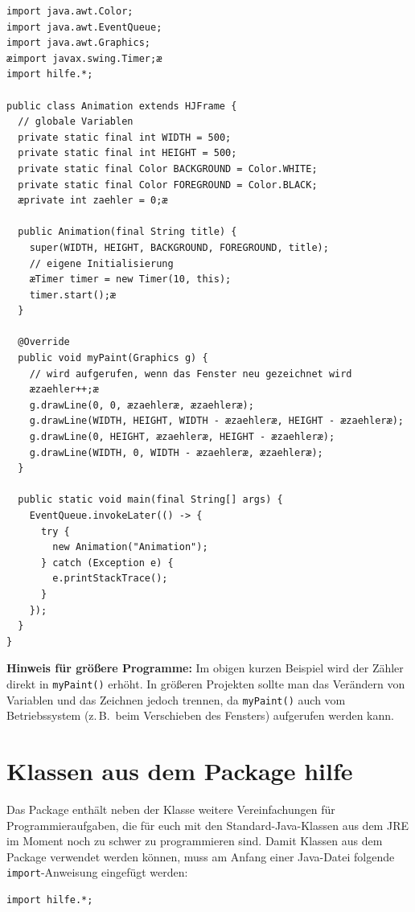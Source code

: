 \begin{lstlisting}
import java.awt.Color;
import java.awt.EventQueue;
import java.awt.Graphics;
æimport javax.swing.Timer;æ
import hilfe.*;

public class Animation extends HJFrame {
  // globale Variablen
  private static final int WIDTH = 500;
  private static final int HEIGHT = 500;
  private static final Color BACKGROUND = Color.WHITE;
  private static final Color FOREGROUND = Color.BLACK;
  æprivate int zaehler = 0;æ

  public Animation(final String title) {
    super(WIDTH, HEIGHT, BACKGROUND, FOREGROUND, title);
    // eigene Initialisierung
    æTimer timer = new Timer(10, this);
    timer.start();æ
  }
  
  @Override
  public void myPaint(Graphics g) {
    // wird aufgerufen, wenn das Fenster neu gezeichnet wird
    æzaehler++;æ
    g.drawLine(0, 0, æzaehleræ, æzaehleræ);
    g.drawLine(WIDTH, HEIGHT, WIDTH - æzaehleræ, HEIGHT - æzaehleræ);
    g.drawLine(0, HEIGHT, æzaehleræ, HEIGHT - æzaehleræ);
    g.drawLine(WIDTH, 0, WIDTH - æzaehleræ, æzaehleræ);
  }
  
  public static void main(final String[] args) {
    EventQueue.invokeLater(() -> {
      try {
        new Animation("Animation");
      } catch (Exception e) {
        e.printStackTrace();
      }
    });
  }
}
\end{lstlisting}

\noindent \textbf{Hinweis für größere Programme:} Im obigen kurzen Beispiel wird
der Zähler direkt in \lstinline|myPaint()| erhöht. In größeren Projekten
sollte man das Verändern von Variablen und das Zeichnen jedoch trennen, da
\lstinline|myPaint()| auch vom Betriebssystem (z.\,B.\ beim Verschieben des
Fensters) aufgerufen werden kann.


\section{Klassen aus dem Package hilfe}

Das Package  enthält neben der Klasse  weitere
Vereinfachungen für Programmieraufgaben, die für euch mit den
Standard-Java-Klassen aus dem JRE im Moment noch zu schwer zu programmieren
sind. Damit Klassen aus dem Package  verwendet werden können,
muss am Anfang einer Java-Datei folgende \lstinline|import|-Anweisung eingefügt
werden:

\begin{lstlisting}
import hilfe.*;
\end{lstlisting}

